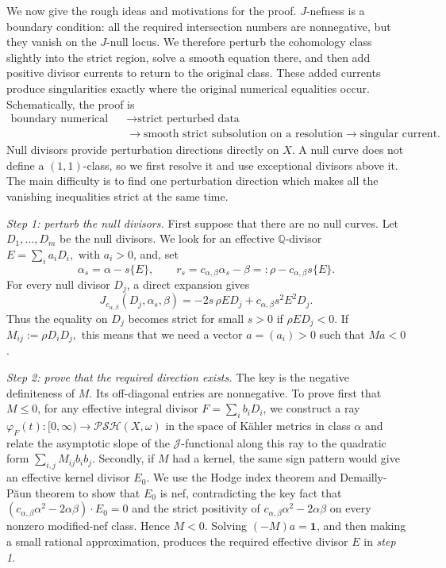 \documentclass[reqno]{amsart}
\theoremstyle{remark}
\newcommand{\Psh}{\mathcal{PSH}}
\newcommand{\cab}{c_{\alpha,\beta}}
\def\cJ{{\mathcal J}}
\theoremstyle{plain}
\begin{document}
We now give the rough ideas and motivations for the proof.  $J$-nefness is a boundary condition: all the required intersection numbers are nonnegative, but they vanish on the $J$-null locus.  We therefore perturb the cohomology class slightly into
the strict region, solve a smooth equation there, and then add positive
divisor currents to return to the original class.  These added currents
produce singularities exactly where the original numerical equalities
occur.  Schematically, the proof is
\[
 \begin{aligned}
 \text{boundary numerical data}
 &\longrightarrow \text{strict perturbed data}\\
 &\longrightarrow \text{smooth strict subsolution on a resolution}
 \longrightarrow \text{singular current}.
 \end{aligned}
\]
Null divisors provide perturbation directions directly on $X$.  A
null curve does not define a $(1,1)$-class, so we first resolve it and
use exceptional divisors above it.  The main difficulty is to find one
perturbation direction which makes all the vanishing inequalities
strict at the same time.

\smallskip
\noindent\emph{Step 1: perturb the null divisors.}
First suppose that there are no null curves.    Let $D_1,\ldots,D_m$ be the null divisors.  We look for an
effective $\mathbb Q$-divisor $ E=\sum_i a_iD_i, \text{ with }a_i>0$, 
and, set \[\alpha_s=\alpha-s\{E\}, \qquad r_s=\cab\alpha_s-\beta=:\rho-\cab s\{E\}.\]
For every null divisor $D_j$, a direct expansion gives
\begin{equation}\label{eq:intro-first-variation}
 J_{\cab}(D_j,\alpha_s,\beta)
 =-2s\,\rho ED_j+\cab s^2E^2D_j.
\end{equation}
Thus the equality on $D_j$ becomes strict for small $s>0$ if
$\rho ED_j<0$.  If $M_{ij}:=\rho D_iD_j,$
this means that we need a vector $a=(a_i)>0$ such that $Ma<0$.

\smallskip
\noindent\emph{Step 2: prove that the required direction exists.}
The key is the negative definiteness of $M$.  Its off-diagonal entries are nonnegative.  To prove first that $M\leq0$, for any effective integral divisor $F=\sum_ib_iD_i$, we construct a ray $\varphi_F(t):[0,\infty)\to \Psh(X,\omega)$ in the space of K\"ahler metrics in class $\alpha$ and relate the asymptotic slope of the $\cJ$-functional along this ray to the quadratic form $\sum_{i,j}M_{ij}b_ib_j$.
 Secondly, if $M$ had a kernel, the
same sign pattern would give an effective kernel divisor $E_0$.
We use the Hodge index theorem and Demailly-P\u{a}un theorem to show that $E_0$ is nef, contradicting
the key fact that $(\cab\alpha^2-2\alpha\beta)\cdot E_0=0$ and the strict positivity of $\cab\alpha^2-2\alpha\beta$ on every nonzero
modified-nef class.  Hence $M<0$.  Solving
$(-M)a=\mathbf1$, and then making a small rational approximation,
produces the required effective divisor $E$ in \emph{step 1}.
\end{document}
